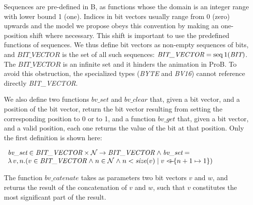 \documentclass[a4paper]{llncs}
\begin{document}
Sequences are pre-defined in B, as functions whose the domain is an
integer range with lower bound 1 (one). Indices in bit vectors usually
range from 0 (zero) upwards and the model we propose obeys this
convention by making an one-position shift where necessary. This shift
is important to use the predefined functions of sequences. We thus
define bit vectors as non-empty sequences of bits, and
$\textit{BIT\_VECTOR}$ is the set of all such sequences:
$\textit{BIT\_VECTOR} = \mathop{\mathstrut{\rm seq}}\nolimits1(\textit{BIT})$. The $\textit{BIT\_VECTOR}$ is an infinite set and it hinders the animation in ProB. 
To avoid this obstruction, the specialized types (\textit{BYTE} and \textit{BV16}) cannot reference directly \textit{BIT\_VECTOR}.

%

We also define two functions $\textit{bv\_set}$ and $\textit{bv\_clear}$ that, given a bit vector, and a
position of the bit vector, return the bit vector resulting from setting the corresponding position to 0
or to 1, and a function $\textit{bv\_get}$ that, given a bit vector, and a valid position, each one
returns the value of the bit at that position. Only the first definition is shown here:


$
\begin{array}{l}
\textit{bv\_set} \in \textit{BIT\_VECTOR} \times \nat \fun \textit{BIT\_VECTOR} \land \textit{bv\_set} =\\
\lambda v, n . (v \in \textit{BIT\_VECTOR} \land n \in \nat \land n <\textit{size}(v)
\mid v \lover \{ n+1 \mapsto 1 \})
\end{array}
$


The function $bv\_catenate$ takes as parameters two bit vectors $v$ and $w$, and returns the result of the
concatenation of $v$ and $w$, such that $v$ constitutes the most significant part of the result.


\end{document}
